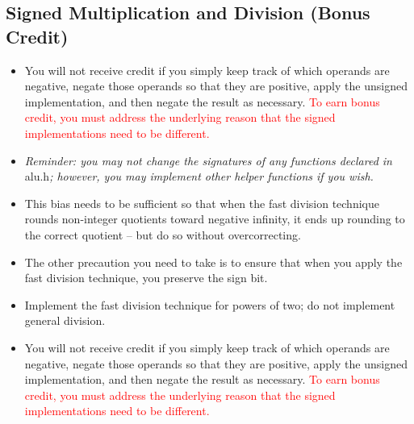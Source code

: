 \subsection{Signed Multiplication and Division (Bonus Credit)}\label{subsec:tldrSignedMultiplicationDivision}
\begin{description}
    \begin{itemize}
        \item You will not receive credit if you simply keep track of which operands are negative, negate those operands so that they are positive, apply the unsigned implementation, and then negate the result as necessary.
            \textcolor{red}{To earn bonus credit, you must address the underlying reason that the signed implementations need to be different.}
        \item \textit{Reminder: you may not change the signatures of any functions declared in }alu.h\textit{; however, you may implement other helper functions if you wish.}
    \end{itemize}
    \vspace{1cm}
    \begin{itemize}
        \item This bias needs to be sufficient so that when the fast division technique rounds non-integer quotients toward negative infinity, it ends up rounding to the correct quotient -- but do so without overcorrecting.
        \item The other precaution you need to take is to ensure that when you apply the fast division technique, you preserve the sign bit.
    \end{itemize}
    \begin{itemize}
        \item Implement the fast division technique for powers of two; do not implement general division.
        \item You will not receive credit if you simply keep track of which operands are negative, negate those operands so that they are positive, apply the unsigned implementation, and then negate the result as necessary.
            \textcolor{red}{To earn bonus credit, you must address the underlying reason that the signed implementations need to be different.}
    \end{itemize}
\end{description}